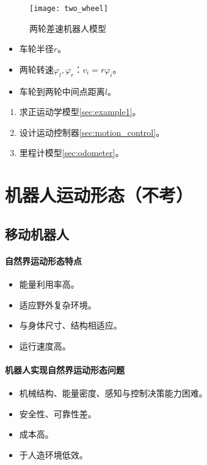 \documentclass[
12pt, %
a4paper, 
oneside, %
headinclude,footinclude, %
]{scrartcl}
\begin{document}
\noindent
\begin{minipage}{0.3\textwidth}
\begin{figure}[H]
\centering
\texttt{[image: two\_wheel]} 
\caption{两轮差速机器人模型}
\end{figure}
\end{minipage}
\begin{minipage}{0.4\textwidth}
\begin{itemize}
\item 车轮半径$ r $。
\item 两轮转速$ \varphi_l,\varphi_r $：$ v_i = r\varphi_i $。
\item 车轮到两轮中间点距离$ l $。
\end{itemize}
\end{minipage}
\begin{minipage}{0.3\textwidth}
\begin{enumerate}
\item 求正运动学模型\ref{sec:example1}。
\item 设计运动控制器\ref{sec:motion_control}。
\item 里程计模型\ref{sec:odometer}。
\end{enumerate}
\end{minipage}
\section{机器人运动形态（不考）}
\subsection[移动机器人]{移动机器人}
\noindent
\begin{minipage}{0.4\textwidth}
\paragraph{自然界运动形态特点}
\begin{itemize}
\item 能量利用率高。
\item 适应野外复杂环境。
\item 与身体尺寸、结构相适应。
\item 运行速度高。
\end{itemize}
\end{minipage}
\begin{minipage}{0.6\textwidth}
\paragraph{机器人实现自然界运动形态问题}
\begin{itemize}
\item 机械结构、能量密度、感知与控制决策能力困难。
\item 安全性、可靠性差。
\item 成本高。
\item 于人造环境低效。
\end{itemize}
\end{minipage}
\end{document}
